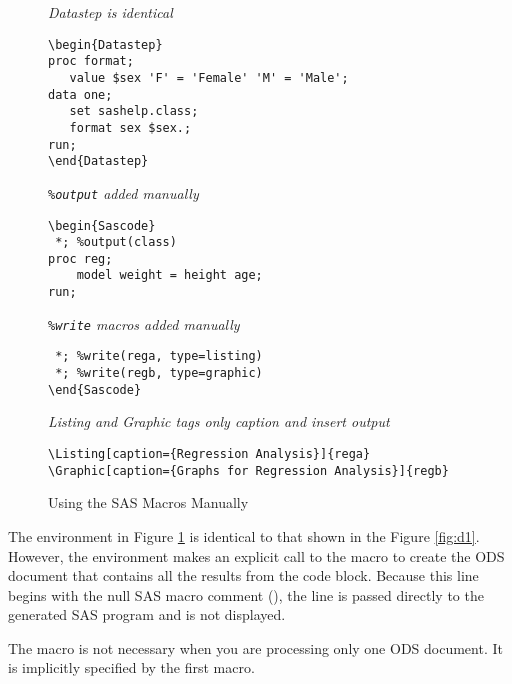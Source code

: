 \documentclass[article,oneside]{memoir}
\begin{document}
\begin{figure}[H]
\begin{framed}
\begin{snugshade}
{\hfil\textit{Datastep is identical}\hfil}
\begin{verbatim}
\begin{Datastep}
proc format;
   value $sex 'F' = 'Female' 'M' = 'Male';
data one;
   set sashelp.class;
   format sex $sex.;
run;
\end{Datastep}
\end{verbatim}
\end{snugshade}
\begin{snugshade}
{\hfil\textit{\texttt{\%output} added manually}\hfil}
\begin{verbatim}
\begin{Sascode}
 *; %output(class)
proc reg;
    model weight = height age;
run;
\end{verbatim}
\end{snugshade}
\begin{snugshade}
{\hfil\textit{\texttt{\%write} macros added manually}\hfil}
\begin{verbatim}
 *; %write(rega, type=listing)             
 *; %write(regb, type=graphic)
\end{Sascode}  
\end{verbatim}
\end{snugshade}
\begin{snugshade}
{\hfil\textit{Listing and Graphic tags only caption and insert output}\hfil}
\begin{verbatim}
\Listing[caption={Regression Analysis}]{rega}         
\Graphic[caption={Graphs for Regression Analysis}]{regb}
\end{verbatim}
\end{snugshade}
\end{framed}
\caption{Using the SAS Macros Manually}\label{fig:manual}
\end{figure}
  
  The  environment in Figure \ref{fig:manual} is identical to that shown in the 
  Figure \ref{fig:d1}. However, the 
  environment makes an explicit call to the  macro to create
  the ODS document that contains all the results from the code block.  
  Because this line begins with the null SAS macro comment (\Code{\%*;}), the line
  is passed directly to the generated SAS program and is not displayed.
  
  The  macro is not necessary when you are processing
  only one ODS document. It is implicitly specified by the first  macro.
  
\end{document}
